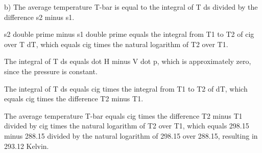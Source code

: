 b) The average temperature T-bar is equal to the integral of T ds divided by the difference s2 minus s1.

s2 double prime minus s1 double prime equals the integral from T1 to T2 of cig over T dT, which equals cig times the natural logarithm of T2 over T1.

The integral of T ds equals dot H minus V dot p, which is approximately zero, since the pressure is constant.

The integral of T ds equals cig times the integral from T1 to T2 of dT, which equals cig times the difference T2 minus T1.

The average temperature T-bar equals cig times the difference T2 minus T1 divided by cig times the natural logarithm of T2 over T1, which equals 298.15 minus 288.15 divided by the natural logarithm of 298.15 over 288.15, resulting in 293.12 Kelvin.
